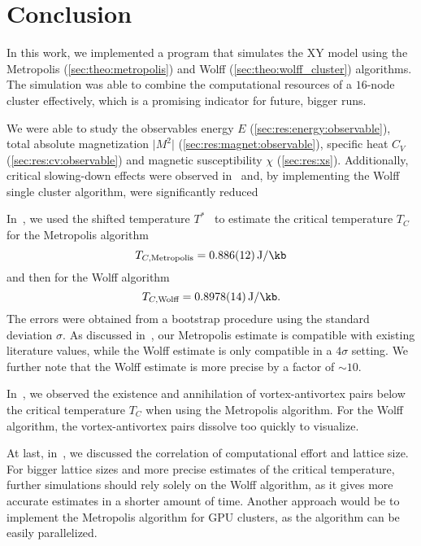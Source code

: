 \chapter{Conclusion}
	In this work, we implemented a program that simulates the XY model using the Metropolis (\cref{sec:theo:metropolis}) and Wolff (\cref{sec:theo:wolff_cluster}) algorithms. The simulation was able to combine the computational resources of a $16$-node cluster effectively, which is a promising indicator for future, bigger runs.
	
	We were able to study the observables energy $E$ (\cref{sec:res:energy:observable}), total absolute magnetization $\lvert M^2 \rvert$ (\cref{sec:res:magnet:observable}), specific heat $C_V$ (\cref{sec:res:cv:observable}) and magnetic susceptibility $\chi$ (\cref{sec:res:xs}). Additionally, critical slowing-down effects were observed in~ and, by implementing the Wolff single cluster algorithm, were significantly reduced
	
	In~, we used the shifted temperature $T^*$~\citep{shifted} to estimate the critical temperature $T_C$ for the Metropolis algorithm
	\begin{equation}
		T_{C, \text{Metropolis}} = \SI{0.886(12)}{\J\per\kb}
	\end{equation}
	and then for the Wolff algorithm
	\begin{equation}
		T_{C, \text{Wolff}} = \SI{0.8978(14)}{\J\per\kb}.
	\end{equation}
	The errors were obtained from a bootstrap procedure using the standard deviation $\sigma$. As discussed in~, our Metropolis estimate is compatible with existing literature values, while the Wolff estimate is only compatible in a $4\sigma$ setting. We further note that the Wolff estimate is more precise by a factor of $\sim 10$.
	
	In~, we observed the existence and annihilation of vortex-antivortex pairs below the critical temperature $T_C$ when using the Metropolis algorithm. For the Wolff algorithm, the vortex-antivortex pairs dissolve too quickly to visualize.
	
	At last, in~, we discussed the correlation of computational effort and lattice size. For bigger lattice sizes and more precise estimates of the critical temperature, further simulations should rely solely on the Wolff algorithm, as it gives more accurate estimates in a shorter amount of time. Another approach would be to implement the Metropolis algorithm for GPU clusters, as the algorithm can be easily parallelized.